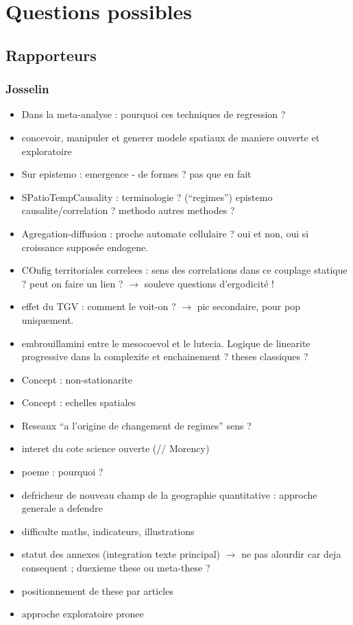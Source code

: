 \documentclass[11pt]{article}
\begin{document}
\section*{Questions possibles}


\subsection*{Rapporteurs}


\subsubsection*{Josselin}

\begin{itemize}
	\item Dans la meta-analyse : pourquoi ces techniques de regression ?
	\item concevoir, manipuler et generer modele spatiaux de maniere ouverte et exploratoire
	\item Sur epistemo : emergence - de formes ? pas que en fait
	\item SPatioTempCausality : terminologie ? (``regimes'') epistemo causalite/correlation ? methodo autres methodes ?
	\item Agregation-diffusion : proche automate cellulaire ? oui et non, oui si croissance supposée endogene.
	\item COnfig territoriales correlees : sens des correlations dans ce couplage statique ? peut on faire un lien ? $\rightarrow$ souleve questions d'ergodicité !
	\item effet du TGV : comment le voit-on ? $\rightarrow$ pic secondaire, pour pop uniquement.
	\item embrouillamini entre le mesocoevol et le lutecia. Logique de linearite progressive dans la complexite et enchainement ? theses classiques ?
	\item Concept : non-stationarite
	\item Concept : echelles spatiales
	\item Reseaux ``a l'origine de changement de regimes'' sens ?
	\item interet du cote science ouverte (// Morency)
	\item poeme : pourquoi ?
	\item defricheur de nouveau champ de la geographie quantitative : approche generale a defendre
	\item difficulte maths, indicateurs, illustrations
	\item statut des annexes (integration texte principal) $\rightarrow$ ne pas alourdir car deja consequent ; duexieme these ou meta-these ?
	\item positionnement de these par articles
	\item approche exploratoire pronee
\end{itemize}
\end{document}
